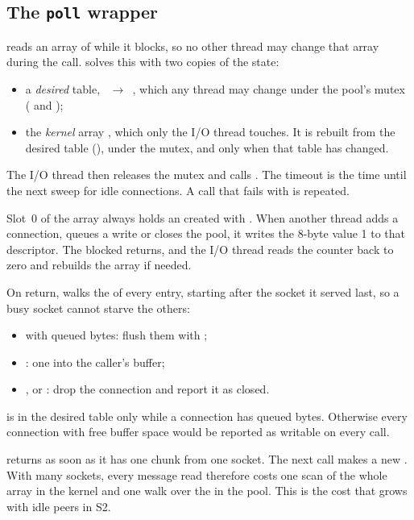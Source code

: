 \subsection{The \texttt{poll} wrapper}
\label{sec:wrap-poll}

 reads an array of  while it blocks, so no other
thread may change that array during the call.  solves this with two
copies of the state:
\begin{itemize}
  \item a \emph{desired} table, ~$\to$~, which any thread may
        change under the pool's mutex ( and );
  \item the \emph{kernel} array , which only the I/O thread touches. It
        is rebuilt from the desired table (), under the mutex, and
        only when that table has changed.
\end{itemize}
The I/O thread then releases the mutex and calls .
The timeout is the time until the next sweep for idle connections. A call that fails
with  is repeated.

Slot~0 of the array always holds an  created with
. When another thread adds a connection, queues a
write or closes the pool, it writes the 8-byte value 1 to that descriptor. The
blocked  returns, and the I/O thread reads the counter back to zero and
rebuilds the array if needed.

On return,  walks the  of every entry,
starting after the socket it served last, so a busy socket cannot starve the others:
\begin{itemize}
  \item {} with queued bytes: flush them with ;
  \item {}: one  into the caller's buffer;
  \item {},  or : drop the connection and
        report it as closed.
\end{itemize}
 is in the desired table only while a connection has queued bytes.
Otherwise every connection with free buffer space would be reported as writable on
every call.

 returns as soon as it has one chunk from one socket. The next call
makes a new . With many sockets, every message read therefore costs one
scan of the whole array in the kernel and one walk over the  in the
pool. This is the cost that grows with idle peers in S2.

